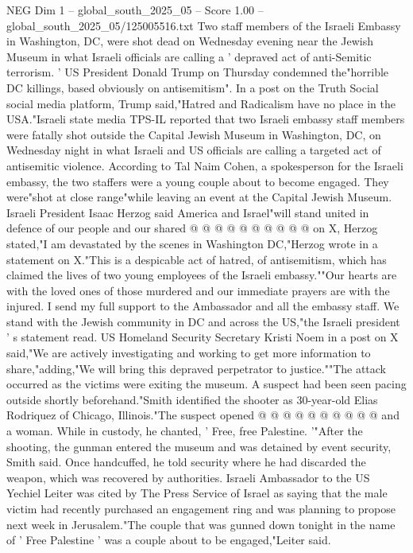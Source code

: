 \begin{textsample}{NEG Dim 1 – global\_south\_2025\_05 – Score 1.00 – global\_south\_2025\_05/125005516.txt}  \label{ex:f1_neg_383}
Two staff members of the Israeli Embassy in Washington, DC, were shot dead on Wednesday evening near the Jewish Museum in what Israeli officials are calling a ' depraved act of anti-Semitic terrorism. ' US President Donald Trump on Thursday condemned the"horrible DC killings, based obviously on antisemitism".
In a post on the Truth Social social media platform, Trump said,"Hatred and Radicalism have no place in the USA."Israeli state media TPS-IL reported that two Israeli embassy staff members were fatally shot outside the Capital Jewish Museum in Washington, DC, on Wednesday night in what Israeli and US officials are calling a targeted act of antisemitic violence.
According to Tal Naim Cohen, a spokesperson for the Israeli embassy, the two staffers were a young couple about to become engaged.
They were"shot at close range"while leaving an event at the Capital Jewish Museum.
Israeli President Isaac Herzog said America and Israel"will stand united in defence of our people and our shared @ @ @ @ @ @ @ @ @ @ on X, Herzog stated,"I am devastated by the scenes in Washington DC,"Herzog wrote in a statement on X."This is a despicable act of hatred, of antisemitism, which has claimed the lives of two young employees of the Israeli embassy.""Our hearts are with the loved ones of those murdered and our immediate prayers are with the injured.
I send my full support to the Ambassador and all the embassy staff.
We stand with the Jewish community in DC and across the US,"the Israeli president ' s statement read.
US Homeland Security Secretary Kristi Noem in a post on X said,"We are actively investigating and working to get more information to share,"adding,"We will bring this depraved perpetrator to justice.""The attack occurred as the victims were exiting the museum.
A suspect had been seen pacing outside shortly beforehand."Smith identified the shooter as 30-year-old Elias Rodriquez of Chicago, Illinois."The suspect opened @ @ @ @ @ @ @ @ @ @ and a woman.
While in custody, he chanted, ' Free, free Palestine. '"After the shooting, the gunman entered the museum and was detained by event security, Smith said.
Once handcuffed, he told security where he had discarded the weapon, which was recovered by authorities.
Israeli Ambassador to the US Yechiel Leiter was cited by The Press Service of Israel as saying that the male victim had recently purchased an engagement ring and was planning to propose next week in Jerusalem."The couple that was gunned down tonight in the name of ' Free Palestine ' was a couple about to be engaged,"Leiter said.

\end{textsample}
